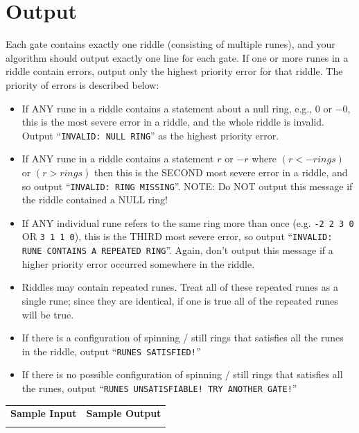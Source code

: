 \documentclass{article}
\begin{document}
\section{Output}

Each gate contains exactly one riddle (consisting of multiple runes), and your algorithm should output exactly one line for each gate. If one or more runes in a riddle contain errors, output only the highest priority error for that riddle. The priority of errors is described below:
\begin{itemize}
\item If ANY rune in a riddle contains a statement about a null ring, e.g., $0$ or $-0$, this is the most severe error in a riddle, and the whole riddle is invalid. Output ``\verb+INVALID: NULL RING+'' as the highest priority error. 
\item If ANY rune in a riddle contains a statement $r$ or $-r$ where $(r < -rings)$ or $(r > rings)$ 
then this is the SECOND most severe error in a riddle, and so output ``\verb+INVALID: RING MISSING+''. NOTE: Do NOT output this message if the riddle contained a NULL ring! 
\item If ANY individual rune refers to the same ring more than once
(e.g. \verb+-2 2 3 0+  OR \verb+3 1 1 0+), this is the THIRD most severe error, so output ``\verb+INVALID: RUNE CONTAINS A REPEATED RING+''. Again, don't output this message if a higher priority error occurred somewhere in the riddle. 
\item Riddles may contain repeated runes.   Treat all of these repeated runes as a single rune; since they are identical, if one is true all of the repeated runes will be true.
\item If there is a configuration of spinning / still rings that satisfies all the runes in the riddle, output ``\verb+RUNES SATISFIED!+''
\item If there is no possible configuration of spinning / still rings that satisfies all the runes, output ``\verb+RUNES UNSATISFIABLE! TRY ANOTHER GATE!+''
\end{itemize}


%

\vskip 16pt
\noindent
\setlength{\extrarowheight}{4pt}
\begin{tabularx}{\textwidth}{ | p{5cm} | X | }
\hline
\textbf{Sample Input} & \textbf{Sample Output} \\

&

\\
\hline
\end{tabularx}
\end{document}
